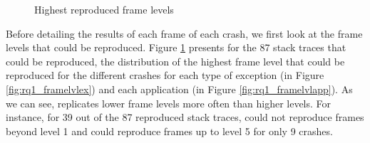 \begin{figure}[t]
	\centering
	\caption{Highest reproduced frame levels}
	\label{fig:highestframe}
\end{figure}

Before detailing the results of each frame of each crash, we first look at the frame levels that could be reproduced. Figure \ref{fig:highestframe} presents for the 87 stack traces that could be reproduced, the distribution of the highest frame level that could be reproduced for the different crashes for each type of exception (in Figure \ref{fig:rq1_framelvlex}) and each application (in Figure \ref{fig:rq1_framelvlapp}).
As we can see, \evocrash replicates lower frame levels more often than higher levels. 
For instance, for 39 out of  the 87 reproduced stack traces, \evocrash could not reproduce frames beyond level 1 and could reproduce frames up to level 5 for only 9 crashes. 

